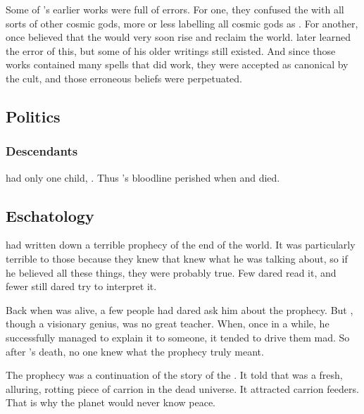 Some of \Sethicus's earlier works were full of errors. 
For one, they confused the \xss with all sorts of other cosmic gods, more or less labelling all cosmic gods as \xss. 
For another, \Sethicus once believed that the \xss would very soon rise and reclaim the world. 
\Sethicus later learned the error of this, but some of his older writings still existed. 
And since those works contained many spells that did work, they were accepted as canonical by the cult, and those erroneous beliefs were perpetuated. 









\subsection{Politics}





\subsubsection{Descendants}
\Sethicus had only one child, . 
Thus \Sethicus's bloodline perished when \Nexagglachel and  died.









\subsection{Eschatology}
\Sethicus had written down a terrible prophecy of the end of the world. 
It was particularly terrible to those  because they knew that \Sethicus knew what he was talking about, so if he believed all these things, they were probably true. 
Few dared read it, and fewer still dared try to interpret it.

Back when \Sethicus was alive, a few people had dared ask him about the prophecy. 
But \Sethicus, though a visionary genius, was no great teacher. 
When, once in a while, he successfully managed to explain it to someone, it tended to drive them mad. 
So after \Sethicus's death, no one knew what the prophecy truly meant. 

The prophecy was a continuation of the story of the . 
It told that \Miith was a fresh, alluring, rotting piece of carrion in the dead universe. 
It attracted carrion feeders. 
That is why the planet would never know peace. 

